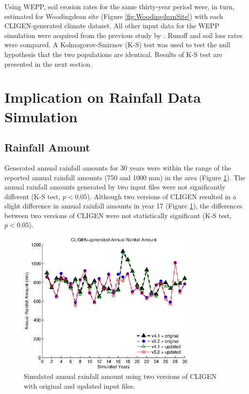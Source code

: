 Using WEPP, soil erosion rates for the same thirty-year period were, in turn,
estimated for Woodingdean site (Figure \ref{fig:WoodingdeanSite}) with each
CLIGEN-generated climate dataset. All other input data for the WEPP simulation
were acquired from the previous study by \citet{favis-mortlock1998-141}. Runoff
and soil loss rates were compared.
A Kolmogorov-Smirnov (K-S) test was used to test the null hypothesis that the
two populations are identical. Results of K-S test are presented in the next
section.

\section{Implication on Rainfall Data Simulation}
\label{sec:RainfallSimulation}

\subsection{Rainfall Amount}
Generated annual rainfall amounts for 30 years were within the range of the
reported annual rainfall amounts (750 and 1000 mm) in the area (Figure
\ref{fig:cligen_annual_amount}). The annual rainfall amounts generated by two
input files were not significantly different (K-S test, $p<0.05$). Although two
versions of CLIGEN resulted in a slight difference in annual rainfall amounts in
year 17 (Figure \ref{fig:cligen_annual_amount}), the differences between two
versions of CLIGEN were not statistically significant (K-S test, $p<0.05$).

\begin{figure}[htbp]
  \centering
   \includegraphics[width=0.8\textwidth]{./img/cligen_annual_amount_series}
  \caption{Simulated annual rainfall amount using two versions of CLIGEN with
original and updated input files.}
  \label{fig:cligen_annual_amount}
\end{figure}

